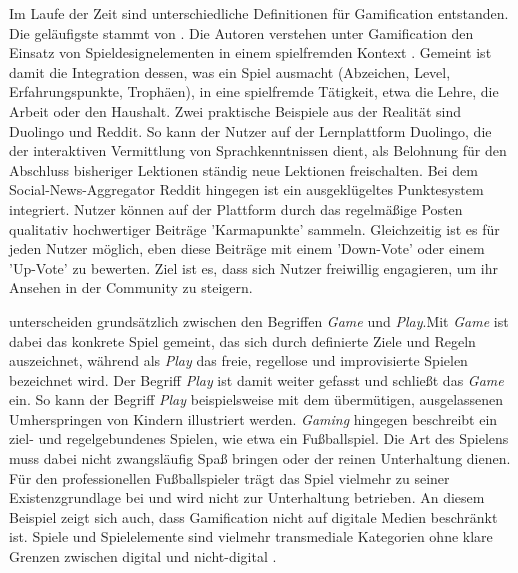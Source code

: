 Im Laufe der Zeit sind unterschiedliche Definitionen für Gamification entstanden. Die geläufigste stammt von . Die Autoren verstehen unter Gamification den Einsatz von Spieldesignelementen in einem spielfremden Kontext \cite{deterding_game_2011}. Gemeint ist damit die Integration dessen, was ein Spiel ausmacht (Abzeichen, Level, Erfahrungspunkte, Trophäen), in eine spielfremde Tätigkeit, etwa die Lehre, die Arbeit oder den Haushalt. Zwei praktische Beispiele aus der Realität sind Duolingo und Reddit. So kann der Nutzer auf der Lernplattform Duolingo, die der interaktiven Vermittlung von Sprachkenntnissen dient, als Belohnung für den Abschluss bisheriger Lektionen ständig neue Lektionen freischalten. Bei dem Social-News-Aggregator Reddit hingegen ist ein ausgeklügeltes Punktesystem integriert. Nutzer können auf der Plattform durch das regelmäßige Posten qualitativ hochwertiger Beiträge 'Karmapunkte' sammeln. Gleichzeitig ist es für jeden Nutzer möglich, eben diese Beiträge mit einem 'Down-Vote' oder einem 'Up-Vote' zu bewerten. Ziel ist es, dass sich Nutzer freiwillig engagieren, um ihr Ansehen in der Community zu steigern.

 unterscheiden grundsätzlich zwischen den Begriffen \textit{Game} und \textit{Play}.Mit \textit{Game} ist dabei das konkrete Spiel gemeint, das sich durch definierte Ziele und Regeln auszeichnet, während als \textit{Play} das freie, regellose und improvisierte Spielen bezeichnet wird. Der Begriff \textit{Play} ist damit weiter gefasst und schließt das \textit{Game} ein. So kann der Begriff \textit{Play} beispielsweise mit dem übermütigen, ausgelassenen Umherspringen von Kindern illustriert werden. \textit{Gaming} hingegen beschreibt ein ziel- und regelgebundenes Spielen, wie etwa ein Fußballspiel. Die Art des Spielens muss dabei nicht zwangsläufig Spaß bringen oder der reinen Unterhaltung dienen. Für den professionellen Fußballspieler trägt das Spiel vielmehr zu seiner Existenzgrundlage bei und wird nicht zur Unterhaltung betrieben. An diesem Beispiel zeigt sich auch, dass Gamification nicht auf digitale Medien beschränkt ist.  Spiele und Spielelemente sind vielmehr transmediale Kategorien ohne klare Grenzen zwischen digital und nicht-digital \cite{deterding_game_2011}.


